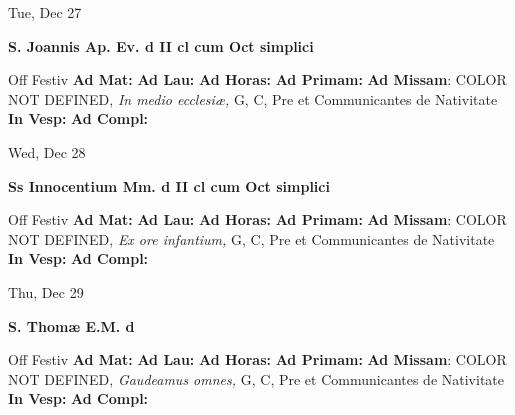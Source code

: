 \documentclass[10pt]{memoir}
\begin{document}
\begin{center}
\begin{minipage}{3.5in}
\vspace{2em}
\begin{center}Tue, Dec 27
\end{center}
\textbf{ \large S. Joannis Ap. Ev.
\textnormal{\normalsize d II cl cum Oct simplici}}

\begin{justify}Off Festiv
\textbf{Ad Mat: }
\textbf{Ad Lau: }
\textbf{Ad Horas: }
\textbf{Ad Primam: }\textbf{Ad Missam}: COLOR NOT DEFINED, \textit{In medio ecclesiæ,} G, C, Pre et Communicantes de Nativitate
\textbf{In Vesp: }
\textbf{Ad Compl: }
\end{justify}
\end{minipage}
\end{center}

\begin{center}
\begin{minipage}{3.5in}
\vspace{2em}
\begin{center}Wed, Dec 28
\end{center}
\textbf{ \large Ss Innocentium Mm.
\textnormal{\normalsize d II cl cum Oct simplici}}

\begin{justify}Off Festiv
\textbf{Ad Mat: }
\textbf{Ad Lau: }
\textbf{Ad Horas: }
\textbf{Ad Primam: }\textbf{Ad Missam}: COLOR NOT DEFINED, \textit{Ex ore infantium,} G, C, Pre et Communicantes de Nativitate
\textbf{In Vesp: }
\textbf{Ad Compl: }
\end{justify}
\end{minipage}
\end{center}

\begin{center}
\begin{minipage}{3.5in}
\vspace{2em}
\begin{center}Thu, Dec 29
\end{center}
\textbf{ \large S. Thomæ E.M.
\textnormal{\normalsize d}}

\begin{justify}Off Festiv
\textbf{Ad Mat: }
\textbf{Ad Lau: }
\textbf{Ad Horas: }
\textbf{Ad Primam: }\textbf{Ad Missam}: COLOR NOT DEFINED, \textit{Gaudeamus omnes,} G, C, Pre et Communicantes de Nativitate
\textbf{In Vesp: }
\textbf{Ad Compl: }
\end{justify}
\end{minipage}
\end{center}
\end{document}
